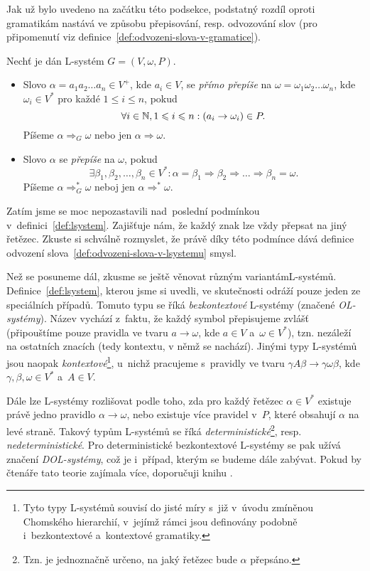 Jak už bylo uvedeno na začátku této podsekce, podstatný rozdíl oproti gramatikám nastává ve způsobu přepisování, resp. odvozování slov (pro připomenutí viz definice~\ref{def:odvozeni-slova-v-gramatice}).
\begin{definition}\label{def:odvozeni-slova-v-lsystemu}
    Nechť je dán L-systém $G=(V,\omega,P)$.
    \begin{itemize}
        \item Slovo $\alpha=a_1a_2\ldots a_n\in V^+$, kde $a_i\in V$, se \emph{přímo přepíše} na $\omega=\omega_1\omega_2\ldots\omega_n$, kde $\omega_i\in V^*$ pro každé $1\leqslant i\leqslant n$, pokud
        \[\forall i\in\mathbb{N},1\leqslant i\leqslant n: (a_i\to\omega_i)\in P.\]
        Píšeme $\alpha\Rightarrow_G\omega$ nebo jen $\alpha\Rightarrow\omega$.
        \item Slovo $\alpha$ se \emph{přepíše} na $\omega$, pokud
        \[\exists\beta_1,\beta_2,\ldots,\beta_n\in V^*:\alpha=\beta_1\Rightarrow\beta_2\Rightarrow\dots\Rightarrow\beta_n=\omega.\]
        Píšeme $\alpha\Rightarrow_G^*\omega$ neboj jen $\alpha\Rightarrow^*\omega$.
    \end{itemize}
\end{definition}
Zatím jsme se moc nepozastavili nad~poslední podmínkou v~definici~\ref{def:lsystem}. Zajišťuje nám, že každý znak lze vždy přepsat na jiný řetězec. Zkuste si schválně rozmyslet, že právě díky této podmínce dává definice odvození slova~\ref{def:odvozeni-slova-v-lsystemu} smysl.

Než se posuneme dál, zkusme se ještě věnovat různým variantám\linebreak L-systémů. Definice~\ref{def:lsystem}, kterou jsme si uvedli, ve skutečnosti odráží pouze jeden ze speciálních případů. Tomuto typu se říká \emph{bezkontextové} L-systémy (značené \emph{OL-systémy}). Název vychází z~faktu, že každý symbol přepisujeme zvlášť (připouštíme pouze pravidla ve tvaru $a\to\omega$, kde $a\in V$ a~$\omega\in V^*$), tzn. nezáleží na ostatních znacích (tedy kontextu, v němž se nachází). Jinými typy L-systémů jsou naopak \emph{kontextové}\footnote{Tyto typy L-systémů souvisí do jisté míry s~již v~úvodu zmíněnou Chomského hierarchií, v~jejímž rámci jsou definovány podobně i~bezkontextové a~kontextové gramatiky.}, u~nichž pracujeme s~pravidly ve tvaru $\gamma A\beta\to\gamma\omega\beta$, kde $\gamma,\beta,\omega\in V^*$ a~$A\in V$.

Dále lze L-systémy rozlišovat podle toho, zda pro každý řetězec $\alpha\in V^*$ existuje právě jedno pravidlo $\alpha\to\omega$, nebo existuje více pravidel v~$P$, které obsahují $\alpha$ na levé straně. Takový typům L-systémů se říká \emph{deterministické}\footnote{Tzn. je jednoznačně určeno, na jaký řetězec bude $\alpha$ přepsáno.}, resp. \emph{nedeterministické}. Pro deterministické bezkontextové L-systémy se pak užívá značení \emph{DOL-systémy}, což je i~případ, kterým se budeme dále zabývat. Pokud by čtenáře tato teorie zajímala více, doporučuji knihu \cite{Prusinkiewicz1990}.

